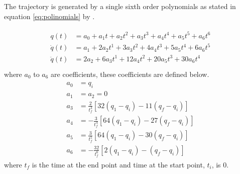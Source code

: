             \noindent
            The trajectory is generated by a single sixth order polynomials as stated in equation \ref{eq:polinomials} by \cite{erasmus2023guidance}.

            \begin{align} \label{eq:polinomials}
                \begin{split}
                    q(t) &= a_0 + a_1t + a_2t^2 + a_3t^3 + a_4t^4 +a_5t^5 + a_6t^6 \\
                    \dot{q}(t) &= a_1 + 2a_2t^1 + 3a_3t^2 + 4a_4t^3 + 5a_5t^4 + 6a_6t^5 \\
                    \ddot{q}(t) &= 2a_2 + 6a_3t^1 + 12a_4t^2 + 20a_5t^3 + 30a_6t^4 \\
                \end{split}
            \end{align}
            where \(a_0\) to \(a_6\) are coefficients, these coefficients are defined below.
            \begin{align}
                \begin{split}
                    a_0 &= q_i \\
                    a_1 &= a_2 = 0 \\
                    a_3 &= \frac{2}{t^3_f}[32(q_1-q_i)-11(q_f-q_i)] \\
                    a_4 &= -\frac{3}{t^4_f}[64(q_1-q_i)-27(q_f-q_i)] \\
                    a_5 &= \frac{3}{t^5_f}[64(q_1-q_i)-30(q_f-q_i)] \\
                    a_6 &= -\frac{32}{t^6_f}[2(q_1-q_i)-(q_f-q_i)]
                \end{split}
            \end{align}
            where \(t_f\) is the time at the end point and time at the start point, \(t_i\), is \(0\).





